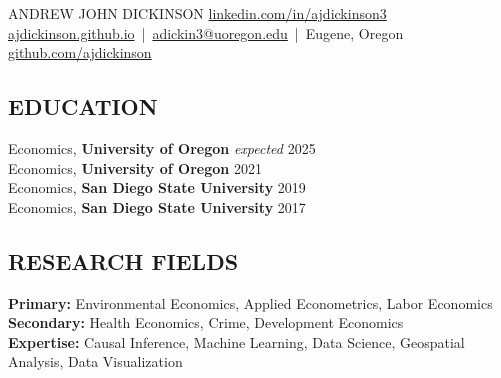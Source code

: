 \documentclass[11pt]{article}
\begin{document}
\raggedright
\thispagestyle{empty}

{\huge ANDREW JOHN DICKINSON} \hfill
  {\footnotesize\href{https://www.linkedin.com/in/andrew-dickinson-675266253}{linkedin.com/in/ajdickinson3} \faLinkedin}\\
{\footnotesize\href{https://ajdickinson.github.io}{ajdickinson.github.io}} \,|\, 
{\footnotesize\href{mailto:adickin3@uoregon.edu}{adickin3@uoregon.edu}} \,|\, 
{\footnotesize Eugene, Oregon} \hfill
{\footnotesize\href{https://github.com/ajdickinson}{github.com/ajdickinson} \faGithub}


\subsection*{EDUCATION}
 Economics, \textbf{University of Oregon} \hfill \textit{expected} 2025 \\
 Economics, \textbf{University of Oregon} \hfill 2021 \\
 Economics, \textbf{San Diego State University} \hfill 2019 \\
 Economics, \textbf{San Diego State University} \hfill 2017 \\


\subsection*{RESEARCH FIELDS}
\textbf{Primary:} Environmental Economics, Applied Econometrics, Labor Economics \\
\textbf{Secondary:} Health Economics, Crime, Development Economics \\
\textbf{Expertise:} Causal Inference, Machine Learning, Data Science, Geospatial Analysis, Data Visualization \\
\end{document}
